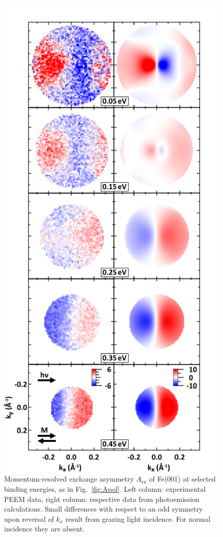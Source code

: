 \documentclass[prl,twocolumn,floatfix,superscriptaddress,aps]{revtex4-2}
\begin{document}
\begin{figure}
    \centering
    \includegraphics[width = 0.7\columnwidth]{FePaperAex.pdf}
    \caption{Momentum-resolved exchange asymmetry $A_{\mathrm{ex}}$ of Fe(001) at selected binding energies, as in Fig.~\ref{fig:Apol}. Left column: experimental PEEM data, right column: respective data from  photoemission calculations. Small differences with respect to an odd symmetry upon reversal of $k_{x}$ result from grazing light incidence. For normal incidence they are absent.}
    \label{fig:Aex}
\end{figure}
\end{document}
